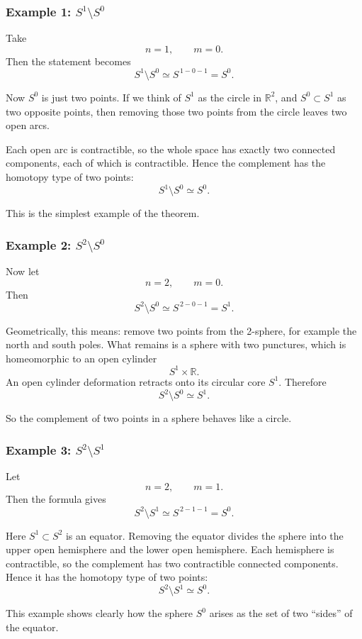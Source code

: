 \documentclass[12pt,a4paper]{article}
\theoremstyle{notespace}
\begin{document}
\subsubsection{Example 1: \(S^1\setminus S^0\)}

Take
\[
n=1,
\qquad
m=0.
\]
Then the statement becomes
\[
S^1\setminus S^0 \simeq S^{\,1-0-1}=S^0.
\]

Now \(S^0\) is just two points. If we think of \(S^1\) as the circle in \(\mathbb{R}^2\), and \(S^0\subset S^1\) as two opposite points, then removing those two points from the circle leaves two open arcs.

Each open arc is contractible, so the whole space has exactly two connected components, each of which is contractible. Hence the complement has the homotopy type of two points:
\[
S^1\setminus S^0 \simeq S^0.
\]

This is the simplest example of the theorem.

\subsubsection{Example 2: \(S^2\setminus S^0\)}

Now let
\[
n=2,
\qquad
m=0.
\]
Then
\[
S^2\setminus S^0 \simeq S^{\,2-0-1}=S^1.
\]

Geometrically, this means: remove two points from the 2-sphere, for example the north and south poles. What remains is a sphere with two punctures, which is homeomorphic to an open cylinder
\[
S^1\times \mathbb{R}.
\]
An open cylinder deformation retracts onto its circular core \(S^1\). Therefore
\[
S^2\setminus S^0 \simeq S^1.
\]

So the complement of two points in a sphere behaves like a circle.

\subsubsection{Example 3: \(S^2\setminus S^1\)}

Let
\[
n=2,
\qquad
m=1.
\]
Then the formula gives
\[
S^2\setminus S^1 \simeq S^{\,2-1-1}=S^0.
\]

Here \(S^1\subset S^2\) is an equator. Removing the equator divides the sphere into the upper open hemisphere and the lower open hemisphere. Each hemisphere is contractible, so the complement has two contractible connected components. Hence it has the homotopy type of two points:
\[
S^2\setminus S^1 \simeq S^0.
\]

This example shows clearly how the sphere \(S^0\) arises as the set of two ``sides'' of the equator.
\end{document}
